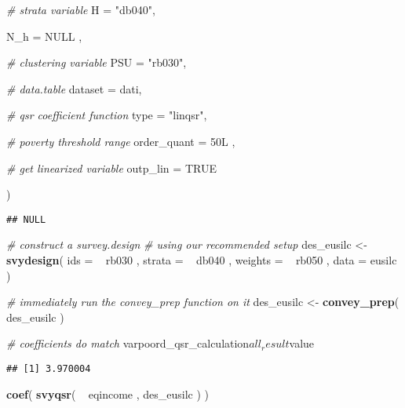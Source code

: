\documentclass[]{book}
\newenvironment{Shaded}{\begin{snugshade}}{\end{snugshade}}
\newcommand{\KeywordTok}[1]{\textcolor[rgb]{0.13,0.29,0.53}{\textbf{{#1}}}}
\newcommand{\DataTypeTok}[1]{\textcolor[rgb]{0.13,0.29,0.53}{{#1}}}
\newcommand{\StringTok}[1]{\textcolor[rgb]{0.31,0.60,0.02}{{#1}}}
\newcommand{\CommentTok}[1]{\textcolor[rgb]{0.56,0.35,0.01}{\textit{{#1}}}}
\newcommand{\OtherTok}[1]{\textcolor[rgb]{0.56,0.35,0.01}{{#1}}}
\newcommand{\NormalTok}[1]{{#1}}
\begin{document}
\begin{Shaded}
\begin{Highlighting}[]
        \CommentTok{# strata variable}
        \DataTypeTok{H =} \StringTok{"db040"}\NormalTok{, }
        
        \DataTypeTok{N_h =} \OtherTok{NULL} \NormalTok{,}
        
        \CommentTok{# clustering variable}
        \DataTypeTok{PSU =} \StringTok{"rb030"}\NormalTok{, }
        
        \CommentTok{# data.table}
        \DataTypeTok{dataset =} \NormalTok{dati, }
        
        \CommentTok{# qsr coefficient function}
        \DataTypeTok{type =} \StringTok{"linqsr"}\NormalTok{,}
      
      \CommentTok{# poverty threshold range}
      \DataTypeTok{order_quant =} \NormalTok{50L ,}
      
      \CommentTok{# get linearized variable}
      \DataTypeTok{outp_lin =} \OtherTok{TRUE}
        
    \NormalTok{)}
\end{Highlighting}
\end{Shaded}

\begin{verbatim}
## NULL
\end{verbatim}

\begin{Shaded}
\begin{Highlighting}[]
\CommentTok{# construct a survey.design}
\CommentTok{# using our recommended setup}
\NormalTok{des_eusilc <-}\StringTok{ }
\StringTok{    }\KeywordTok{svydesign}\NormalTok{( }
        \DataTypeTok{ids =} \NormalTok{~}\StringTok{ }\NormalTok{rb030 , }
        \DataTypeTok{strata =} \NormalTok{~}\StringTok{ }\NormalTok{db040 ,  }
        \DataTypeTok{weights =} \NormalTok{~}\StringTok{ }\NormalTok{rb050 , }
        \DataTypeTok{data =} \NormalTok{eusilc}
    \NormalTok{)}

\CommentTok{# immediately run the convey_prep function on it}
\NormalTok{des_eusilc <-}\StringTok{ }\KeywordTok{convey_prep}\NormalTok{( des_eusilc )}

\CommentTok{# coefficients do match}
\NormalTok{varpoord_qsr_calculation$all_result$value}
\end{Highlighting}
\end{Shaded}

\begin{verbatim}
## [1] 3.970004
\end{verbatim}

\begin{Shaded}
\begin{Highlighting}[]
\KeywordTok{coef}\NormalTok{( }\KeywordTok{svyqsr}\NormalTok{( ~}\StringTok{ }\NormalTok{eqincome , des_eusilc ) )}
\end{Highlighting}
\end{Shaded}
\end{document}
